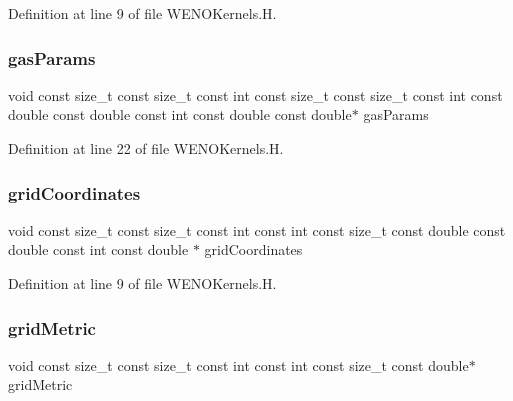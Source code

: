 Definition at line 9 of file W\+E\+N\+O\+Kernels.\+H.

\hypertarget{WENOKernels_8H_a4a903750b21cf9a330a9ec9a41617ff6}{}\label{WENOKernels_8H_a4a903750b21cf9a330a9ec9a41617ff6} 
\subsubsection{\texorpdfstring{gas\+Params}{gasParams}}
{\footnotesize\ttfamily void const size\+\_\+t const size\+\_\+t const int const size\+\_\+t const size\+\_\+t const int const double const double const int const double const double$\ast$ gas\+Params}



Definition at line 22 of file W\+E\+N\+O\+Kernels.\+H.

\hypertarget{WENOKernels_8H_a55f433dcd5ee1a2b6a9d73ce18fcaa58}{}\label{WENOKernels_8H_a55f433dcd5ee1a2b6a9d73ce18fcaa58} 
\subsubsection{\texorpdfstring{grid\+Coordinates}{gridCoordinates}}
{\footnotesize\ttfamily void const size\+\_\+t const size\+\_\+t const int const int const size\+\_\+t const double const double const int const double $\ast$ grid\+Coordinates}



Definition at line 9 of file W\+E\+N\+O\+Kernels.\+H.

\hypertarget{WENOKernels_8H_a901f07fa4e3f966a2f6951d6c5974e89}{}\label{WENOKernels_8H_a901f07fa4e3f966a2f6951d6c5974e89} 
\subsubsection{\texorpdfstring{grid\+Metric}{gridMetric}}
{\footnotesize\ttfamily void const size\+\_\+t const size\+\_\+t const int const int const size\+\_\+t const double$\ast$ grid\+Metric}



